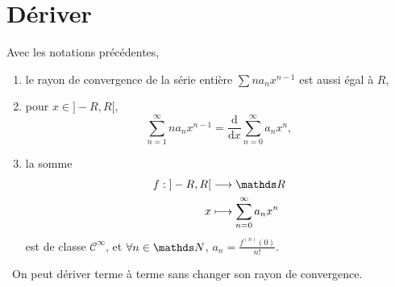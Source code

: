 \begin{exm}
	
\end{exm}

\begin{exo}
	
\end{exo}

\section{Dériver}

\begin{thm}
	Avec les notations précédentes,
	\begin{enumerate}
		\item le rayon de convergence de la série entière $\sum n a_n x^{n-1}$\/ est aussi égal à $R$,
		\item pour $x \in {]-R,R[}$, \[
				\sum_{n=1}^\infty n a_n x^{n-1} = \frac{\mathrm{d}}{\mathrm{d}x} \sum_{n=0}^\infty a_n x^n
			,\]
		\item la somme \begin{align*}
				f: {]-R,R[} &\longrightarrow \R \\
				x &\longmapsto \sum_{n=0}^\infty a_n x^n
			\end{align*} est de classe $\mathcal{C}^\infty$, et $\forall n \in \N$, $a_n = \frac{f^{(n)}(0)}{n!}$.
	\end{enumerate}
	\guillemotleft~On peut dériver terme à terme sans changer son rayon de convergence.~\guillemotright
\end{thm}

